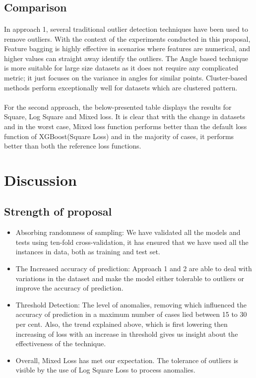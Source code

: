 \documentclass[runningheads]{llncs}
\begin{document}
\newline
\\

\subsection{Comparison}
\paragraph{} In approach 1, several traditional outlier detection techniques have been used to remove outliers. With the context of the experiments conducted in this proposal, Feature bagging is highly effective in scenarios where features are numerical, and higher values can straight away identify the outliers. The Angle based technique is more suitable for large size datasets as it does not require any complicated metric; it just focuses on the variance in angles for similar points. Cluster-based methods perform exceptionally well for datasets which are clustered pattern.

\paragraph{} For the second approach, the below-presented table displays the results for Square, Log Square and Mixed loss. It is clear that with the change in datasets and in the worst case, Mixed loss function performs better than the default loss function of XGBoost(Square Loss) and in the majority of cases, it performs better than both the reference loss functions.

\section{Discussion}
\subsection{Strength of proposal}
\begin{itemize}
    \item Absorbing randomness of sampling: We have validated all the models and tests using ten-fold cross-validation, it has ensured that we have used all the instances in data, both as training and test set.
    \item The Increased accuracy of prediction: Approach 1 and 2 are able to deal with variations in the dataset and make the model either tolerable to outliers or improve the accuracy of prediction.
    \item Threshold Detection: The level of anomalies, removing which influenced the accuracy of prediction in a maximum number of cases lied between 15 to 30 per cent. Also, the trend explained above, which is first lowering then increasing of loss with an increase in threshold gives us insight about the effectiveness of the technique.
    \item Overall, Mixed Loss has met our expectation. The tolerance of outliers is visible by the use of Log Square Loss to process anomalies.
\end{itemize}
\end{document}

